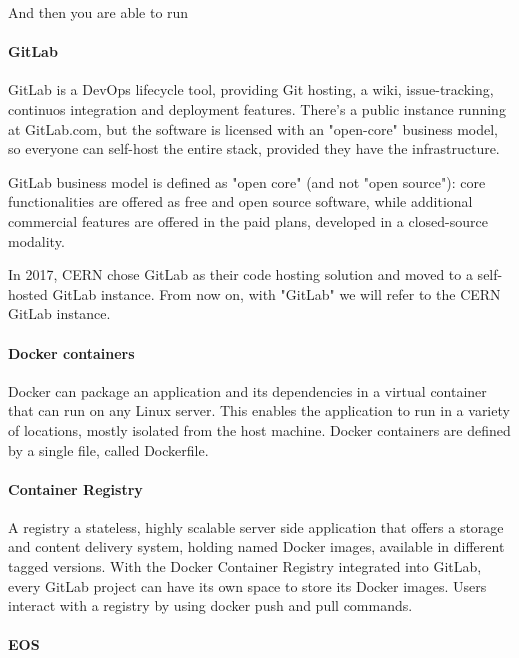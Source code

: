 And then you are able to run


\paragraph{GitLab}

GitLab is a DevOps lifecycle tool, providing Git hosting, a wiki, issue-tracking, continuos integration and deployment features. There's a public instance running at GitLab.com, but the software is licensed with an "open-core" business model, so everyone can self-host the entire stack, provided they have the infrastructure.

GitLab business model is defined as "open core" (and not "open source"): core functionalities are offered as free and open source software, while additional commercial features are offered in the paid plans, developed in a closed-source modality.

In 2017, CERN chose GitLab as their code hosting solution and moved to a self-hosted GitLab instance. From now on, with "GitLab" we will refer to the CERN GitLab instance.

\paragraph{Docker containers}

Docker can package an application and its dependencies in a virtual container that can run on any Linux server. This enables the application to run in a variety of locations, mostly isolated from the host machine. Docker containers are defined by a single file, called Dockerfile.

\paragraph{Container Registry}

A registry a stateless, highly scalable server side application that offers a storage and content delivery system, holding named Docker images, available in different tagged versions. With the Docker Container Registry integrated into GitLab, every GitLab project can have its own space to store its Docker images. Users interact with a registry by using docker push and pull commands.

\paragraph{EOS}

